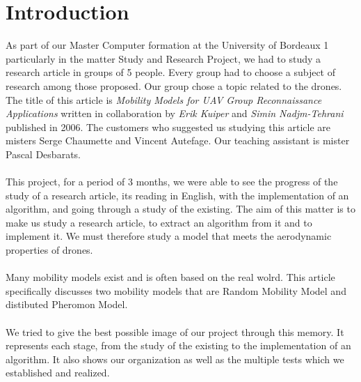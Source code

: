 \chapter*{Introduction}

As part of our Master Computer formation at the University of Bordeaux 1 particularly in the matter Study and Research Project, we had to study a research article in groups of 5 people. Every group had to choose a subject of research among those proposed. Our group chose a topic related to the drones. The title of this article is \textit{Mobility Models for UAV Group Reconnaissance Applications} written in collaboration by \textit{Erik Kuiper} and \textit{Simin Nadjm-Tehrani} published in 2006. The customers who suggested us studying this article are misters Serge Chaumette and Vincent Autefage. Our teaching assistant is mister Pascal Desbarats.
\\\\

This project, for a period of 3 months, we were able to see the progress of the study of a research article, its reading in English, with the implementation of an algorithm, and going through a study of the existing.
The aim of this matter is to make us study a research article, to extract an algorithm from it and to implement it.
We must therefore study a model that meets the aerodynamic properties of drones.
\\\\

Many mobility models exist and is often based on the real wolrd.
This article specifically discusses two mobility models that are Random Mobility Model and distibuted Pheromon Model.\\\\

We tried to give the best possible image of our project through this memory. It represents each stage, from the study of the existing to the implementation of an algorithm. It also shows our organization as well as the multiple tests which we established and realized. 

